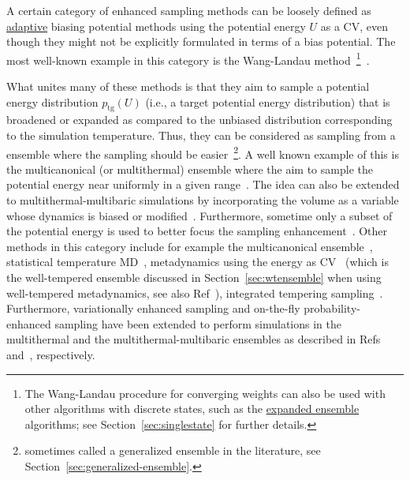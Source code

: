\documentclass[9pt,review]{livecoms}
\begin{document}
A certain category of enhanced sampling methods can be loosely defined as \hyperlink{ref:Adaptive} {adaptive} biasing potential methods using the potential energy $U$ as a CV, even though they might not be explicitly formulated in terms of a bias potential. The most well-known example in this category is the Wang-Landau method~\footnote{The Wang-Landau procedure for converging weights can also be used with other algorithms with discrete states, such as the \hyperlink{ref:ExpEns} {expanded ensemble} algorithms; see Section~\ref{sec:singlestate} for further details.}~\cite{wang-landau:prl:2001:wang-landau}.

What unites many of these methods is that they aim to sample a potential energy distribution $p_{\mathrm{tg}}(U)$ (i.e., a target potential energy distribution) that is broadened or expanded as compared to the unbiased distribution corresponding to the simulation temperature. Thus, they can be considered as sampling from a ensemble where the sampling should be easier~\footnote{sometimes called a generalized ensemble in the literature, see Section~\ref{sec:generalized-ensemble}.}. A well known example of this is the multicanonical (or multithermal) ensemble where the aim to sample the potential energy near uniformly in a given range~\cite{Berg1992_Multicanonical}. The idea can also be extended to multithermal-multibaric simulations by incorporating the volume as a variable whose dynamics is biased or modified~\cite{Okumura_MultiTP_2004,Shell_MultiTP_2002}. Furthermore, sometime only a subset of the potential energy is used to better focus the sampling enhancement~\cite{Yang_SITS_2009}. Other methods in this category include for example
the multicanonical ensemble~\cite{Berg1992_Multicanonical},
statistical temperature MD~\cite{Kim2006_PRL_STMD},
metadynamics using the energy as CV~\cite{Micheletti_MetaE_Energy_2004,Bonomi-PRL-2010}
(which is the well-tempered ensemble discussed in Section~\ref{sec:wtensemble} when using well-tempered metadynamics, see also Ref~\cite{Valsson-JCTC-2013}),
integrated tempering sampling~\cite{Gao_ITS_2008,Gao_ITS_Review_2015}.
Furthermore, variationally enhanced sampling and on-the-fly probability-enhanced sampling have been extended to perform simulations in the multithermal and the multithermal-multibaric ensembles as described in Refs~\citep{Piaggi_MultiVES_2019,Piaggi_MultiVES+CV_2019} and~\citep{invernizzi2020unified}, respectively.
\end{document}
